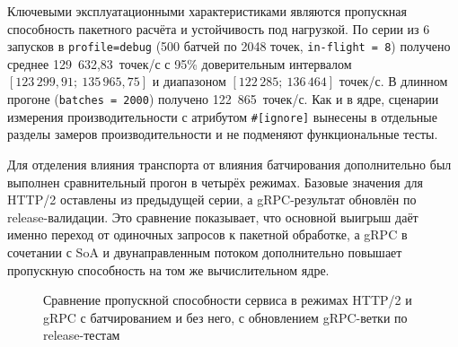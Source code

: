 Ключевыми эксплуатационными характеристиками являются
пропускная способность пакетного расчёта и устойчивость под нагрузкой.  
По серии из 6 запусков 
в \texttt{profile=debug}
(500 батчей по 2048 точек, \texttt{in-flight = 8})
получено среднее 129~632,83~точек/с
с 95\% доверительным интервалом
$[123\,299{,}91;\ 135\,965{,}75]$ и диапазоном
$[122\,285;\ 136\,464]$ точек/с.
В длинном прогоне (\texttt{batches = 2000})
получено 122~865~точек/с.
Как и в ядре, сценарии измерения производительности
с атрибутом \texttt{\#[ignore]}
вынесены в отдельные разделы замеров производительности
и не подменяют функциональные тесты.

Для отделения влияния транспорта от влияния батчирования
дополнительно был выполнен сравнительный прогон в четырёх режимах.
Базовые значения для HTTP/2 оставлены из предыдущей серии,
а gRPC-результат обновлён по release-валидации.
Это сравнение показывает, что основной выигрыш даёт именно переход
от одиночных запросов к пакетной обработке,
а gRPC в сочетании с SoA и двунаправленным потоком
дополнительно повышает пропускную способность на том же вычислительном ядре.

\begin{figure}[htbp]
    \centering
    \caption{Сравнение пропускной способности сервиса в режимах HTTP/2 и gRPC с батчированием и без него, с обновлением gRPC-ветки по release-тестам}
    \label{fig:throughput_comparison}
\end{figure}


